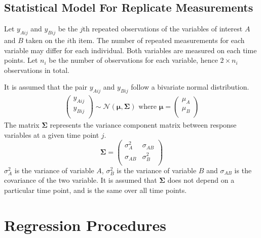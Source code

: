 \documentclass[12pt, a4paper]{report}
\theoremstyle{plain}
\theoremstyle{definition}
\theoremstyle{remark}
\begin{document}
	
	
	
	\subsection{Statistical Model For Replicate Measurements}
	Let $y_{Aij}$ and $y_{Bij}$ be the $j$th repeated observations of the variables of interest $A$ and $B$ taken on the $i$th item. The number of repeated measurements for each variable may differ for each individual.
	Both variables are measured on each time points. Let $n_{i}$ be the number of observations for each variable, hence $2\times n_{i}$ observations in total.
	
	It is assumed that the pair $y_{Aij}$ and $y_{Bij}$ follow a bivariate normal distribution.
	\begin{eqnarray}
	\left(
	\begin{array}{c}
	y_{Aij} \\
	y_{Bij} \\
	\end{array}
	\right) \sim \mathcal{N}(
	\boldsymbol{\mu}, \boldsymbol{\Sigma})\mbox{   where } \boldsymbol{\mu} = \left(
	\begin{array}{c}
	\mu_{A} \\
	\mu_{B} \\
	\end{array}
	\right)
	\end{eqnarray}
	The matrix $\boldsymbol{\Sigma}$ represents the variance component matrix between response variables at a given time point $j$.
	\begin{equation}
	\boldsymbol{\Sigma} = \left( \begin{array}{cc}
	\sigma^2_{A} & \sigma_{AB} \\
	\sigma_{AB} & \sigma^2_{B}\\
	\end{array}\right)
	\end{equation}
	$\sigma^2_{A}$ is the variance of variable $A$, $\sigma^2_{B}$ is the variance of variable $B$ and $\sigma_{AB}$ is the covariance of the two variable. It is assumed that $\boldsymbol{\Sigma}$ does not depend on a particular time point, and is the same over all time points.
	
	
	
	
	
	
	
	
	\section{Regression Procedures}
	
\end{document}
